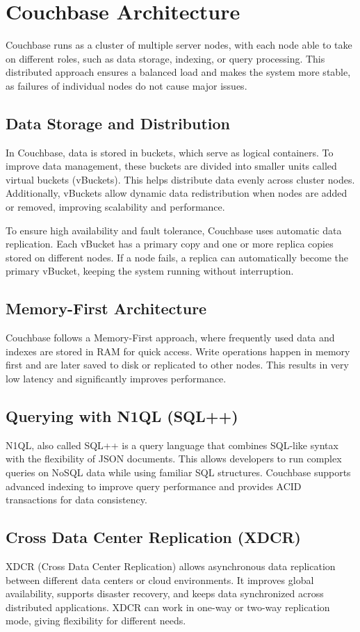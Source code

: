 \newpage
\chapter{Couchbase Architecture}
Couchbase runs as a cluster of multiple server nodes, with each node able to take on different roles, such as data storage, indexing, or query processing. This distributed approach ensures a balanced load and makes the system more stable, as failures of individual nodes do not cause major issues.
\section{Data Storage and Distribution}
In Couchbase, data is stored in buckets, which serve as logical containers. To improve data management, these buckets are divided into smaller units called virtual buckets (vBuckets). This helps distribute data evenly across cluster nodes. Additionally, vBuckets allow dynamic data redistribution when nodes are added or removed, improving scalability and performance.

To ensure high availability and fault tolerance, Couchbase uses automatic data replication. Each vBucket has a primary copy and one or more replica copies stored on different nodes. If a node fails, a replica can automatically become the primary vBucket, keeping the system running without interruption.
\section{Memory-First Architecture}
Couchbase follows a Memory-First approach, where frequently used data and indexes are stored in RAM for quick access. Write operations happen in memory first and are later saved to disk or replicated to other nodes. This results in very low latency and significantly improves performance.
\section{Querying with N1QL (SQL++)}
N1QL, also called SQL++ is a query language that combines SQL-like syntax with the flexibility of JSON documents. This allows developers to run complex queries on NoSQL data while using familiar SQL structures. Couchbase supports advanced indexing to improve query performance and provides ACID transactions for data consistency.
\section{Cross Data Center Replication (XDCR)}
XDCR (Cross Data Center Replication) allows asynchronous data replication between different data centers or cloud environments. It improves global availability, supports disaster recovery, and keeps data synchronized across distributed applications. XDCR can work in one-way or two-way replication mode, giving flexibility for different needs.

